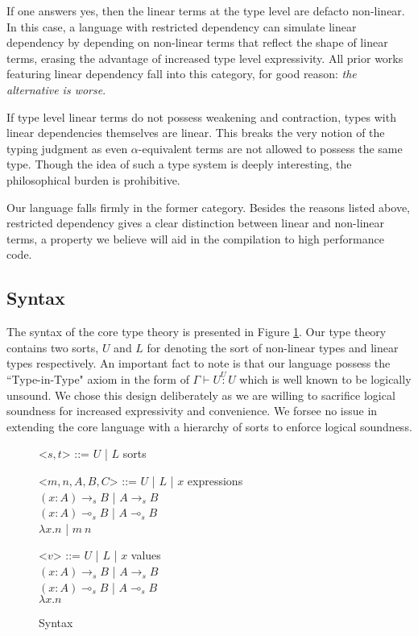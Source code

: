 \documentclass{article}
\newcommand{\indalt}[1][2]{\\\hspace*{-1.2em}\textbar\quad}
\newcommand{\utype}{\overset{U}{:}}
\begin{document}
  If one answers yes, then the linear terms at the type level are defacto non-linear. In this case, a language with restricted dependency can simulate linear dependency by depending on non-linear terms that reflect the shape of linear terms\cite{ldqt}, erasing the advantage of increased type level expressivity. All prior works featuring linear dependency fall into this category, for good reason: \textit{the alternative is worse}.
  
  If type level linear terms do not possess weakening and contraction, types with linear dependencies themselves are linear. This breaks the very notion of the typing judgment as even $\alpha$-equivalent terms are not allowed to possess the same type. Though the idea of such a type system is deeply interesting, the philosophical burden is prohibitive.
  
  Our language falls firmly in the former category. Besides the reasons listed above, restricted dependency gives a clear distinction between linear and non-linear terms, a property we believe will aid in the compilation to high performance code.
  
  \subsection{Syntax}
  The syntax of the core type theory is presented in Figure \ref{syntax}. Our type theory contains two sorts, $U$ and $L$ for denoting the sort of non-linear types and linear types respectively. An important fact to note is that our language possess the ``Type-in-Type" axiom in the form of $\Gamma \vdash U \utype U$ which is well known to be logically unsound. We chose this design deliberately as we are willing to sacrifice logical soundness for increased expressivity and convenience. We forsee no issue in extending the core language with a hierarchy of sorts to enforce logical soundness.

  \begin{figure}[H]
    \caption{Syntax}
    \centering
    \begin{minipage}{0.8\linewidth}
    \begin{grammar}
      <$s, t$> ::= $U$ | $L$ \phantom{| $x$} \hspace*{8em} sorts

      <$m, n, A, B, C$> ::= $U$ | $L$ | $x$  \hspace*{8em} expressions
      \indalt $(x : A) \rightarrow_s B$ | $A \rightarrow_s B$
      \indalt $(x : A) \multimap_s B$ | $A \multimap_s B$
      \indalt $\lambda x. n$ | $m\ n$

      <$v$> ::= $U$ | $L$ | $x$ \hspace*{8em} values
      \indalt $(x : A) \rightarrow_s B$ | $A \rightarrow_s B$
      \indalt $(x : A) \multimap_s B$ | $A \multimap_s B$
      \indalt $\lambda x. n$
    \end{grammar}
    \end{minipage}
    \label{syntax}
  \end{figure}
\end{document}

